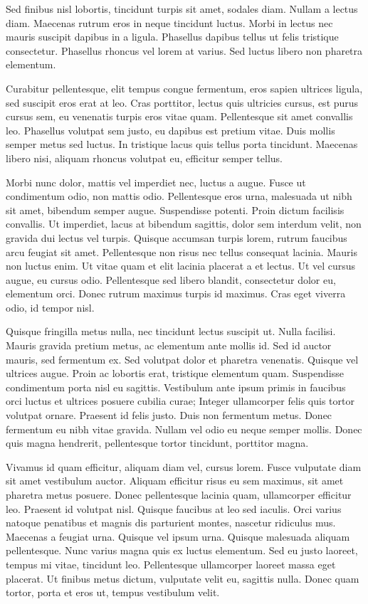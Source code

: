 \documentclass[12pt]{article}
\begin{document}
Sed finibus nisl lobortis, tincidunt turpis sit amet, sodales diam. Nullam a lectus diam. Maecenas rutrum eros in neque tincidunt luctus. Morbi in lectus nec mauris suscipit dapibus in a ligula. Phasellus dapibus tellus ut felis tristique consectetur. Phasellus rhoncus vel lorem at varius. Sed luctus libero non pharetra elementum.

Curabitur pellentesque, elit tempus congue fermentum, eros sapien ultrices ligula, sed suscipit eros erat at leo. Cras porttitor, lectus quis ultricies cursus, est purus cursus sem, eu venenatis turpis eros vitae quam. Pellentesque sit amet convallis leo. Phasellus volutpat sem justo, eu dapibus est pretium vitae. Duis mollis semper metus sed luctus. In tristique lacus quis tellus porta tincidunt. Maecenas libero nisi, aliquam rhoncus volutpat eu, efficitur semper tellus.

Morbi nunc dolor, mattis vel imperdiet nec, luctus a augue. Fusce ut condimentum odio, non mattis odio. Pellentesque eros urna, malesuada ut nibh sit amet, bibendum semper augue. Suspendisse potenti. Proin dictum facilisis convallis. Ut imperdiet, lacus at bibendum sagittis, dolor sem interdum velit, non gravida dui lectus vel turpis. Quisque accumsan turpis lorem, rutrum faucibus arcu feugiat sit amet. Pellentesque non risus nec tellus consequat lacinia. Mauris non luctus enim. Ut vitae quam et elit lacinia placerat a et lectus. Ut vel cursus augue, eu cursus odio. Pellentesque sed libero blandit, consectetur dolor eu, elementum orci. Donec rutrum maximus turpis id maximus. Cras eget viverra odio, id tempor nisl.

Quisque fringilla metus nulla, nec tincidunt lectus suscipit ut. Nulla facilisi. Mauris gravida pretium metus, ac elementum ante mollis id. Sed id auctor mauris, sed fermentum ex. Sed volutpat dolor et pharetra venenatis. Quisque vel ultrices augue. Proin ac lobortis erat, tristique elementum quam. Suspendisse condimentum porta nisl eu sagittis. Vestibulum ante ipsum primis in faucibus orci luctus et ultrices posuere cubilia curae; Integer ullamcorper felis quis tortor volutpat ornare. Praesent id felis justo. Duis non fermentum metus. Donec fermentum eu nibh vitae gravida. Nullam vel odio eu neque semper mollis. Donec quis magna hendrerit, pellentesque tortor tincidunt, porttitor magna.

Vivamus id quam efficitur, aliquam diam vel, cursus lorem. Fusce vulputate diam sit amet vestibulum auctor. Aliquam efficitur risus eu sem maximus, sit amet pharetra metus posuere. Donec pellentesque lacinia quam, ullamcorper efficitur leo. Praesent id volutpat nisl. Quisque faucibus at leo sed iaculis. Orci varius natoque penatibus et magnis dis parturient montes, nascetur ridiculus mus. Maecenas a feugiat urna. Quisque vel ipsum urna. Quisque malesuada aliquam pellentesque. Nunc varius magna quis ex luctus elementum. Sed eu justo laoreet, tempus mi vitae, tincidunt leo. Pellentesque ullamcorper laoreet massa eget placerat. Ut finibus metus dictum, vulputate velit eu, sagittis nulla. Donec quam tortor, porta et eros ut, tempus vestibulum velit.
\end{document}
